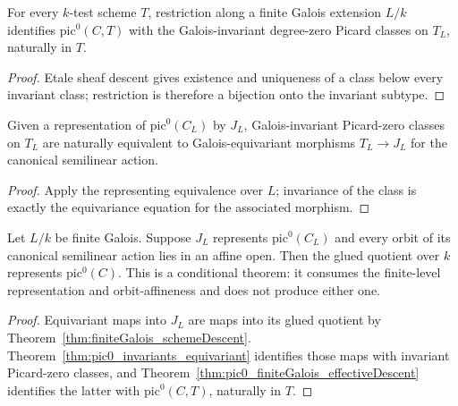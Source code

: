 \begin{theorem}
  \label{thm:pic0_finiteGalois_effectiveDescent}
  \leanok
  For every \(k\)-test scheme \(T\), restriction along a finite Galois extension \(L/k\)
  identifies \(\mathrm{pic}^0(C,T)\) with the Galois-invariant degree-zero Picard classes on
  \(T_L\), naturally in \(T\).
\end{theorem}
\begin{proof}
  \leanok
  Etale sheaf descent gives existence and uniqueness of a class below every invariant class;
  restriction is therefore a bijection onto the invariant subtype.
\end{proof}

\begin{theorem}
  \label{thm:pic0_invariants_equivariant}
  \leanok
  Given a representation of \(\mathrm{pic}^0(C_L)\) by \(J_L\), Galois-invariant Picard-zero
  classes on \(T_L\) are naturally equivalent to Galois-equivariant morphisms
  \(T_L\to J_L\) for the canonical semilinear action.
\end{theorem}
\begin{proof}
  \leanok
  Apply the representing equivalence over \(L\); invariance of the class is exactly the
  equivariance equation for the associated morphism.
\end{proof}

\begin{theorem}
  \label{thm:representableBy_of_finiteGalois_baseChange}
  \leanok
  Let \(L/k\) be finite Galois.  Suppose \(J_L\) represents
  \(\mathrm{pic}^0(C_L)\) and every orbit of its canonical semilinear action lies in an affine
  open.  Then the glued quotient over \(k\) represents \(\mathrm{pic}^0(C)\).  This is a
  conditional theorem: it consumes the finite-level representation and orbit-affineness and
  does not produce either one.
\end{theorem}
\begin{proof}
  \leanok
  Equivariant maps into \(J_L\) are maps into its glued quotient by
  Theorem~\ref{thm:finiteGalois_schemeDescent}.  Theorem~\ref{thm:pic0_invariants_equivariant}
  identifies those maps with invariant Picard-zero classes, and
  Theorem~\ref{thm:pic0_finiteGalois_effectiveDescent} identifies the latter with
  \(\mathrm{pic}^0(C,T)\), naturally in \(T\).
\end{proof}

